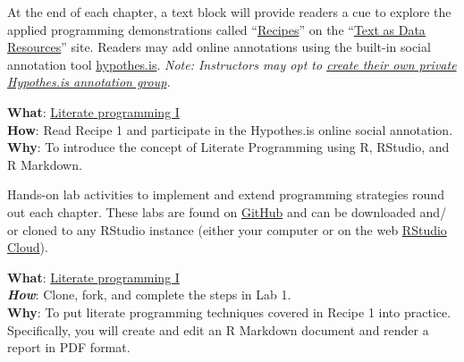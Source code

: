 \documentclass[
  letterpaper,
]{latex/krantz}
\begin{document}
At the end of each chapter, a text block will provide readers a cue to
explore the applied programming demonstrations called
``\href{https://lin380.github.io/tadr/articles/}{Recipes}'' on the
``\href{https://lin380.github.io/tadr}{Text as Data Resources}'' site.
Readers may add online annotations using the built-in social annotation
tool
\href{https://web.hypothes.is/education/annotated/research/}{hypothes.is}.
\emph{Note: Instructors may opt to
\href{https://web.hypothes.is/creating-groups/}{create their own private
Hypothes.is annotation group}.}

\begin{tcolorbox}[enhanced jigsaw, toprule=.15mm, bottomtitle=1mm, coltitle=black, title=\textcolor{quarto-callout-tip-color}{\faLightbulb}\hspace{0.5em}{Recipe}, left=2mm, colframe=quarto-callout-tip-color-frame, bottomrule=.15mm, colbacktitle=quarto-callout-tip-color!10!white, leftrule=.75mm, colback=white, titlerule=0mm, breakable, toptitle=1mm, opacityback=0, arc=.35mm, rightrule=.15mm, opacitybacktitle=0.6]

\textbf{What}:
\href{https://lin380.github.io/tadr/articles/recipe_1.html}{Literate
programming I}\\
\textbf{How}: Read Recipe 1 and participate in the Hypothes.is online
social annotation.\\
\textbf{Why}: To introduce the concept of Literate Programming using R,
RStudio, and R Markdown.

\end{tcolorbox}

Hands-on lab activities to implement and extend programming strategies
round out each chapter. These labs are found on
\href{https://github.com/lin380?q=lab\&type=all\&language=\&sort=name}{GitHub}
and can be downloaded and/ or cloned to any RStudio instance (either
your computer or on the web
\href{https://www.rstudio.com/products/cloud/}{RStudio Cloud}).

\begin{tcolorbox}[enhanced jigsaw, toprule=.15mm, bottomtitle=1mm, coltitle=black, title=\textcolor{quarto-callout-tip-color}{\faLightbulb}\hspace{0.5em}{Lab}, left=2mm, colframe=quarto-callout-tip-color-frame, bottomrule=.15mm, colbacktitle=quarto-callout-tip-color!10!white, leftrule=.75mm, colback=white, titlerule=0mm, breakable, toptitle=1mm, opacityback=0, arc=.35mm, rightrule=.15mm, opacitybacktitle=0.6]

\textbf{What}: \href{https://github.com/lin380/lab_1}{Literate
programming I}\\
\textbf{\emph{How}}: Clone, fork, and complete the steps in Lab 1.\\
\textbf{Why}: To put literate programming techniques covered in Recipe 1
into practice. Specifically, you will create and edit an R Markdown
document and render a report in PDF format.

\end{tcolorbox}
\end{document}
